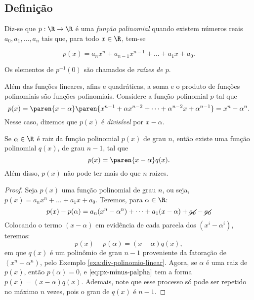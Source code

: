 \subsection{Definição}
\label{sec:definicao-funcoes-polinomiais}

\begin{definition}
Diz-se que $p: \R \to \R$ é uma \emph{função polinomial} quando
existem números reais $a_0, a_1, \dots , a_n$ tais que, para todo $x
\in \R$, tem-se

\begin{equation}\label{funcpol}
p(x) = a_n x^n + a_{n-1} x^{n-1} + \dots + a_1 x + a_0.
\end{equation}

Os elementos de $p^{-1}(0)$ são chamados de \emph{raízes de $p$}.
\end{definition}

\begin{example}
\label{exa:div-polinomio-linear}
Além das funções lineares, afins e quadráticas, a soma e o produto
de funções polinomiais são funções polinomiais. Considere a função
polinomial $p$ tal que $$p(x) = \paren{x - \alpha} \paren{x^{n-1} +
\alpha x^{n-2} + \dots + \alpha^{n-2}x+ \alpha^{n-1}}=x^n -
\alpha^n.$$ Nesse caso, dizemos que $p(x)$ é \emph{divisível} por $x-
\alpha$.
\end{example}

\begin{proposition}
\label{prop:fatoracao-polinomios}
Se $\alpha \in \R$ é raiz da função polinomial $p(x)$ de grau $n$,
então existe uma função polinomial $q(x)$, de grau $n-1$, tal que
$$p(x) = \paren{x- \alpha}q(x).$$
Além disso, $p(x)$ não pode ter mais do que $n$ raízes.
\end{proposition}

\begin{proof}
    Seja $p(x)$ uma função polinomial de grau $n$, ou seja, $p(x)=a_n x^n  + \dots + a_1x + a_0$.
    Teremos, para $\alpha \in \R$:
    \[
        p(x)-p(\alpha) = a_n(x^n-\alpha^n) + \dots + a_1(x-\alpha) + \cancel{a_0}-\cancel{a_0}
    \]   
    Colocando o termo $(x-\alpha)$ em evidência de cada parcela dos $(x^i - \alpha^i)$, teremos:
    \begin{equation}
    \label{eq:px-minus-palpha}
        p(x)-p(\alpha) = (x-\alpha)q(x),
    \end{equation}
    \noindent em que $q(x)$ é um polinômio de grau $n-1$ proveniente da fatoração de $(x^n-\alpha^n)$,
    pelo Exemplo \ref{exa:div-polinomio-linear}. 
    Agora, se $\alpha$ é uma raiz de $p(x)$, então $p(\alpha)=0$, e $\ref{eq:px-minus-palpha}$ tem a forma
    $p(x)=(x-\alpha)q(x)$. 
    Ademais, note que esse processo só pode ser repetido no máximo $n$ vezes, pois o grau de $q(x)$ é
    $n-1$.

\end{proof}


